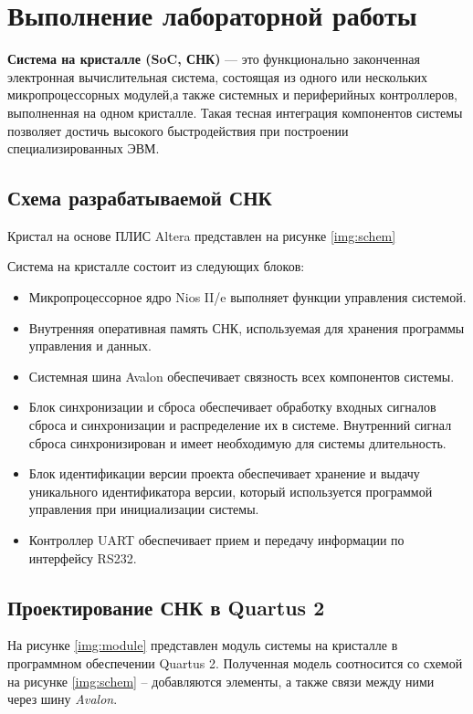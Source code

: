 \chapter{Выполнение лабораторной работы}
\textbf{Система на кристалле  (SoC,  СНК)}  — это функционально законченная электронная вычислительная система, состоящая из одного или нескольких микропроцессорных модулей,а также системных и периферийных контроллеров, выполненная на одном кристалле.  Такая тесная интеграция компонентов системы позволяет достичь высокого быстродействия при построении специализированных ЭВМ.


\section{Схема разрабатываемой СНК}

Кристал на основе ПЛИС Altera представлен на рисунке \ref{img:schem}


Система на кристалле состоит из следующих блоков:
\begin{itemize}
	\item Микропроцессорное ядро Nios II/e выполняет функции управления системой.
	\item Внутренняя оперативная память СНК, используемая для хранения программы управления и данных.
	\item Системная шина Avalon обеспечивает связность всех компонентов системы.
	\item Блок синхронизации и сброса обеспечивает обработку входных сигналов сброса и синхронизации и распределение их в системе. Внутренний сигнал сброса синхронизирован и имеет необходимую для системы длительность.
	\item Блок идентификации версии проекта обеспечивает хранение и выдачу уникального идентификатора версии, который используется программой управления при инициализации системы.
	\item Контроллер UART обеспечивает прием и передачу информации по интерфейсу RS232.
\end{itemize}


\section{Проектирование СНК в Quartus 2}

На рисунке \ref{img:module} представлен модуль системы на кристалле в программном обеспечении Quartus 2. Полученная модель соотносится со схемой на рисунке \ref{img:schem} -- добавляются элементы, а также связи между ними через шину \textit{Avalon}.

